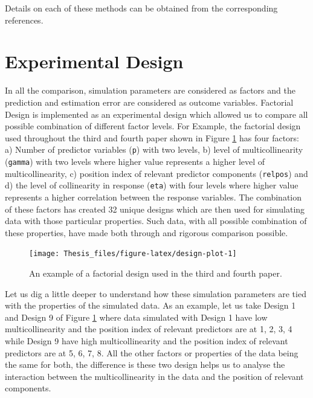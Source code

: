 \documentclass[11pt,twoside,openright,titlepage,
  headinclude,footinclude,BCOR=5mm,
  numbers=noenddot,cleardoublepage=empty,
  tablecaptionabove, dottedtoc,
  bibliography=totoc,paper=a4]{scrreprt}
\begin{document}
Details on each of these methods can be obtained from the corresponding references.

\hypertarget{experimental-design}{%
\section{Experimental Design}\label{experimental-design}}

In all the comparison, simulation parameters are considered as factors and the prediction and estimation error are considered as outcome variables. Factorial Design is implemented as an experimental design which allowed us to compare all possible combination of different factor levels. For Example, the factorial design used throughout the third and fourth paper shown in Figure \ref{fig:design-plot} has four factors: a) Number of predictor variables (\texttt{p}) with two levels, b) level of multicollinearity (\texttt{gamma}) with two levels where higher value represents a higher level of multicollinearity, c) position index of relevant predictor components (\texttt{relpos}) and d) the level of collinearity in response (\texttt{eta}) with four levels where higher value represents a higher correlation between the response variables. The combination of these factors has created 32 unique designs which are then used for simulating data with those particular properties. Such data, with all possible combination of these properties, have made both through and rigorous comparison possible.



\begin{figure}[!htb]
\texttt{[image: Thesis\_files/figure-latex/design-plot-1]} \caption{An example of a factorial design used in the third and fourth paper.}\label{fig:design-plot}
\end{figure}

Let us dig a little deeper to understand how these simulation parameters are tied with the properties of the simulated data. As an example, let us take Design 1 and Design 9 of Figure \ref{fig:design-plot} where data simulated with Design 1 have low multicollinearity and the position index of relevant predictors are at 1, 2, 3, 4 while Design 9 have high multicollinearity and the position index of relevant predictors are at 5, 6, 7, 8. All the other factors or properties of the data being the same for both, the difference is these two design helps us to analyse the interaction between the multicollinearity in the data and the position of relevant components.
\end{document}
